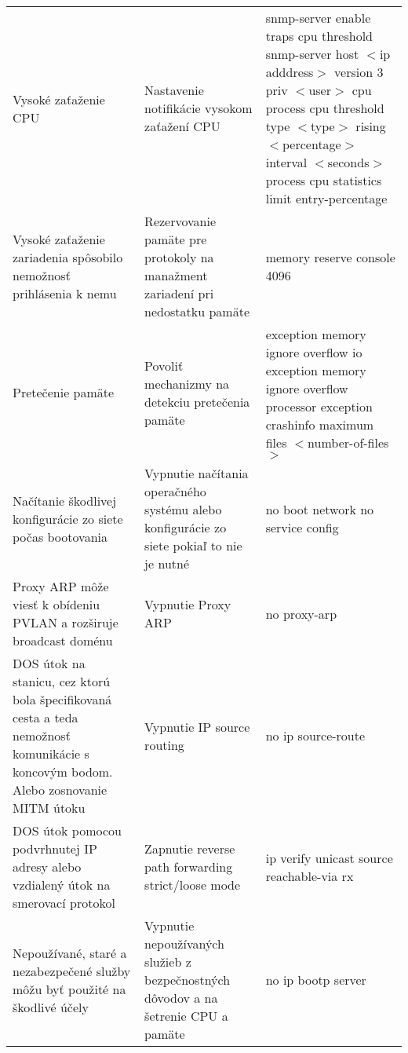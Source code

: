 \begin{longtable}[!htbp]{|L{10em}L{10em}L{34em}|}
	
	 Vysoké zaťaženie CPU	&Nastavenie notifikácie vysokom zaťažení CPU	&snmp-server enable traps cpu threshold
	snmp-server host $<$ip adddress$>$ version 3 priv $<$user$>$ cpu
	process cpu threshold type $<$type$>$ rising $<$percentage$>$ interval $<$seconds$>$
	process cpu statistics limit entry-percentage\\
	
	
	
	Vysoké zaťaženie zariadenia spôsobilo nemožnosť prihlásenia k nemu	&Rezervovanie pamäte pre protokoly na manažment zariadení pri nedostatku pamäte	&memory reserve console 4096\\
	
	
	
	 Pretečenie pamäte	&Povoliť mechanizmy na detekciu pretečenia pamäte	&exception memory ignore overflow io
	exception memory ignore overflow processor
	exception crashinfo maximum files $<$number-of-files$>$\\
	
	
	
	
	Načítanie škodlivej konfigurácie zo siete počas bootovania	&Vypnutie načítania operačného systému alebo konfigurácie zo siete pokiaľ to nie je nutné	&no boot network
	no service config\\
	
	
	
	
	 Proxy ARP môže viesť k obídeniu PVLAN a rozširuje broadcast doménu	&Vypnutie Proxy ARP	&no proxy-arp\\
	DOS útok na stanicu, cez ktorú bola špecifikovaná cesta a teda nemožnosť komunikácie s koncovým bodom. Alebo zosnovanie MITM útoku	&Vypnutie IP source routing	&no ip source-route\\
	
	
	
	
	DOS útok pomocou podvrhnutej IP adresy alebo vzdialený útok na smerovací protokol	&Zapnutie reverse path forwarding strict/loose mode	&ip verify unicast source reachable-via rx\\
	
	
	
	 Nepoužívané, staré a nezabezpečené služby môžu byť použité na škodlivé účely	&Vypnutie nepoužívaných služieb z bezpečnostných dôvodov a na šetrenie CPU a pamäte 	&no ip bootp server\\
	
	
	

\end{longtable}
